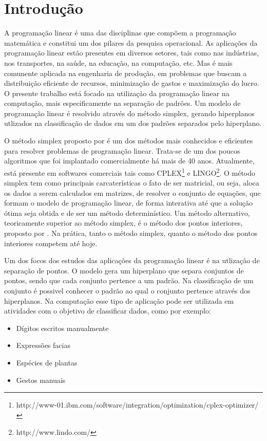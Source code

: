 \chapter{Introdução}

A programação linear é uma das disciplinas que compõem a programação matemática e constitui um dos pilares da pesquisa operacional. As aplicações da programação linear estão presentes em diversos setores, tais como nas indústrias, nos transportes, na saúde, na educação, na computação, etc. Mas é mais comunente aplicada na engenharia de produção, em problemas que buscam a distribuição eficiente de recursos, minimização de gastos e maximização do lucro. O presente trabalho está focado na utilização da programação linear na computação, mais especificamente na separação de padrões. Um modelo de programação linear é resolvido através do método simplex, gerando hiperplanos utlizados na classificação de dados em um dos padrões separados pelo hiperplano.

O método simplex proposto por  é um dos métodos mais conhecidos e eficientes para resolver problemas de programação linear. Trata-se de um dos poucos algoritmos que foi implantado comercialmente há mais de 40 anos. Atualmente, está presente em softwares comerciais tais como CPLEX\footnote{http://www-01.ibm.com/software/integration/optimization/cplex-optimizer/} e LINGO\footnote{http://www.lindo.com/}. O método simplex tem como principais carcaterísticas o fato de ser matricial, ou seja, aloca os dados a serem calculados em matrizes, de resolver o conjunto de equações, que formam o modelo de programação linear, de forma interativa até que a solução ótima seja obtida e de ser um método determinístico. Um método alternativo, teoricamente superior ao método simplex, é o método dos pontos interiores, proposto por . Na prática, tanto o método simplex, quanto o método dos pontos interiores competem até hoje.  

Um dos focos dos estudos das aplicações da programação linear é na utlização de separação de pontos. O modelo gera um hiperplano que separa conjuntos de pontos, sendo que cada conjunto pertence a um padrão. Na classificação de um conjunto é possivel conhecer o padrão ao qual o conjunto pertence através dos hiperplanos. Na computação esse tipo de aplicação pode ser utilizada em atividades com o objetivo de classificar dados, como por exemplo:

\begin{itemize}
\item Dígitos escritos manualmente
\item Expressões facias
\item Espécies de plantas
\item Gestos manuais
\end{itemize}

